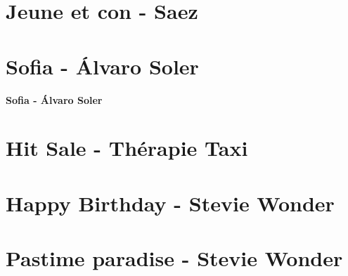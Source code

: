 \documentclass{guitartabs}
\begin{document}
\section{Jeune et con - Saez}
\begin{guitar}

\end{guitar}


\section{Sofia - Álvaro Soler}
\begin{guitar}
\textbf{Sofia - Álvaro Soler}

\end{guitar}


\section{Hit Sale - Thérapie Taxi}
\begin{guitar}

\end{guitar}

\section{Happy Birthday - Stevie Wonder}
\begin{guitar}

\end{guitar}



\section{Pastime paradise - Stevie Wonder}
\begin{guitar}

\end{guitar}
\end{document}
